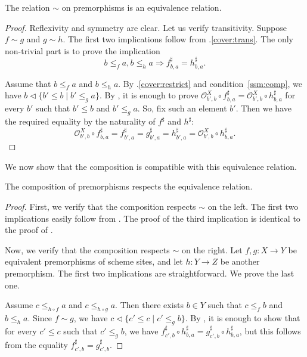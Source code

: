 \documentclass[reqno]{amsart}
\theoremstyle{definition}
\theoremstyle{remark}
\numberwithin{figure}{section}
\newcommand{\cover}{\triangleleft}
\begin{document}
\begin{lem}
The relation $\sim$ on premorphisms is an equivalence relation.
\end{lem}
\begin{proof}
Reflexivity and symmetry are clear.
Let us verify transitivity.
Suppose $f \sim g$ and $g \sim h$.
The first two implications follow from .\eqref{cover:trans}.
The only non-trivial part is to prove the implication
\[ b \leq_f a, b \leq_h a \Rightarrow f^\sharp_{b,a} = h^\sharp_{b,a}. \]

Assume that $b \leq_f a$ and $b \leq_h a$.
By .\eqref{cover:restrict} and condition~\eqref{ssm:comp}, we have $b \cover \{ b' \leq b \mid b' \leq_g a \}$.
By , it is enough to prove $\mathcal{O}^X_{b',b} \circ f^\sharp_{b,a} = \mathcal{O}^X_{b',b} \circ h^\sharp_{b,a}$ for every $b'$ such that $b' \leq b$ and $b' \leq_g a$.
So, fix such an element $b'$.
Then we have the required equality by the naturality of $f^\sharp$ and $h^\sharp$:
\[ \mathcal{O}^X_{b',b} \circ f^\sharp_{b,a} = f^\sharp_{b',a} = g^\sharp_{b',a} = h^\sharp_{b',a} = \mathcal{O}^X_{b',b} \circ h^\sharp_{b,a}. \]
\end{proof}

We now show that the composition is compatible with this equivalence relation.

\begin{lem}
The composition of premorphisms respects the equivalence relation.
\end{lem}
\begin{proof}
First, we verify that the composition respects $\sim$ on the left.
The first two implications easily follow from .
The proof of the third implication is identical to the proof of .


Now, we verify that the composition respects $\sim$ on the right.
Let $f,g : X \to Y$ be equivalent premorphisms of scheme sites, and let $h : Y \to Z$ be another premorphism.
The first two implications are straightforward.
We prove the last one.

Assume $c \leq_{h \circ f} a$ and $c \leq_{h \circ g} a$.
Then there exists $b \in Y$ such that $c \leq_f b$ and $b \leq_h a$.
Since $f \sim g$, we have $c \cover \{ c' \leq c \mid c' \leq_g b \}$.
By , it is enough to show that for every $c' \leq c$ such that $c' \leq_g b$, we have $f^\sharp_{c',b} \circ h^\sharp_{b,a} = g^\sharp_{c',b} \circ h^\sharp_{b,a}$,
but this follows from the equality $f^\sharp_{c',b} = g^\sharp_{c',b}$.
\end{proof}
\end{document}
